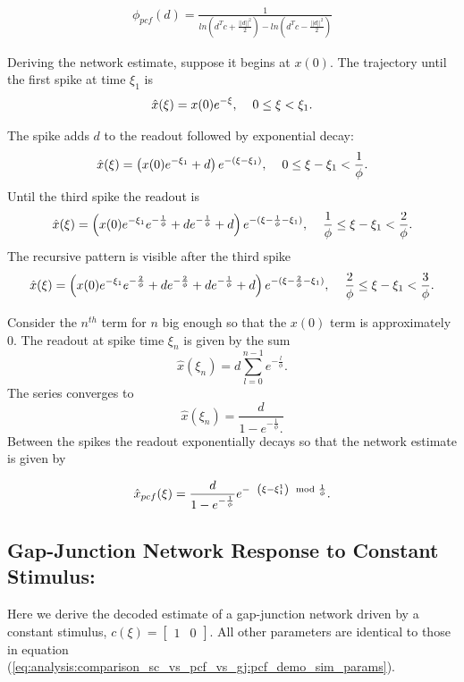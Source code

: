 \begin{align}
\label{eq:analysis:comparison_sc_vs_pcf_vs_gj:const_dynamics:pcf_spike_rate}
	\phi_{pcf}
	\left(
		d
	\right)
	 =
	 \frac
	 {
	 	1
	 }
	 {
		ln
		\left(
			d^T c + \frac{||d||^2}{2}
		\right)
		-
		ln
		\left(
			d^T c - \frac{||d||^2}{2}
		\right)		
	}
\end{align}

Deriving the network estimate, suppose it begins at $x(0)$. The trajectory until the first spike at time $\xi_1$ is
$$
\hat{x}(\xi) = x(0) e^{-\xi}, \hspace{4mm} 0 \leq \xi < \xi_1.
$$

The spike adds $d$ to the readout followed by exponential decay:
$$
\hat{x}(\xi) =
\left(
	x(0) e^{-\xi_1}
    +
	d
\right)
 e^{-(\xi-\xi_1)} , \hspace{4mm} 0 \leq \xi-\xi_1 < \frac{1}{\phi}.
$$
Until the third spike the readout is
$$
\hat{x}(\xi) =
\left(
	x(0) e^{-\xi_1} e^{-\frac{1}{\phi} }
    +
	d e^{-\frac{1}{\phi}}
	+ d
\right)
 e^{-(\xi - \frac{1}{\phi} - \xi_1)}
	 , \hspace{4mm} \frac{1}{\phi} \leq \xi-\xi_1 < \frac{2}{\phi}.
$$
The recursive pattern is visible after the third spike
$$
\hat{x}(\xi) =
\left(
	x(0) e^{-\xi_1} e^{-\frac{2}{\phi} }
    +
	d e^{-\frac{2}{\phi}}
	+ d e^{-\frac{1}{\phi}}
	+d
\right)
 e^{-(\xi - \frac{2}{\phi} - \xi_1)}
	 , \hspace{4mm} \frac{2}{\phi} \leq \xi-\xi_1 < \frac{3}{\phi}.
$$

Consider the $n^{th}$ term for $n$ big enough so that the $x(0)$ term is approximately $0$. The readout at spike time $\xi_n$ is given by the sum
$$
\hat{x}(\xi_n) =  d \sum_{l = 0}^{n-1} e^{-\frac{l}{\phi}}.
$$
The series converges to 
$$
\hat{x}(\xi_n) =  
\frac
{
	d
}
{
	1 - e^{-\frac{1}{\phi}}.
}
$$
Between the spikes the readout exponentially decays so that the network estimate is given by

\begin{align}
\label{eq:analysis:comparison_sc_vs_pcf_vs_gj:const_dynamics:pcf_network_estimate_steady_state}
\hat{x}_{pcf}(\xi) =
\frac
{
	d
}
{
	1 - e^{-\frac{1}{\phi}}
}
e^
{
	- \hspace{2mm}
	\left(
		\xi - \xi_1^1
	\right)
	\mod
	{
		\frac
		{
			1
		}
		{
			\phi
		}
	}
}.
\end{align}


\subsection{Gap-Junction Network Response to Constant Stimulus:} Here we derive the decoded estimate of a gap-junction network driven by a constant stimulus, $c(\xi) = \begin{bmatrix}
1 & 0
\end{bmatrix}
$. All other parameters are identical to those in equation (\ref{eq:analysis:comparison_sc_vs_pcf_vs_gj:pcf_demo_sim_params}).


